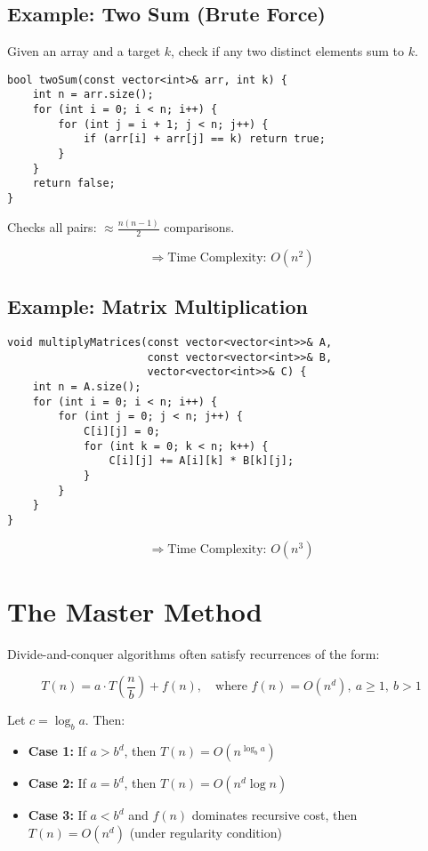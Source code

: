 \documentclass{article}
\begin{document}
\subsection*{Example: Two Sum (Brute Force)}

Given an array and a target $k$, check if any two distinct elements sum to $k$.

\begin{lstlisting}[style=cppstyle]
bool twoSum(const vector<int>& arr, int k) {
    int n = arr.size();
    for (int i = 0; i < n; i++) {
        for (int j = i + 1; j < n; j++) {
            if (arr[i] + arr[j] == k) return true;
        }
    }
    return false;
}
\end{lstlisting}

Checks all pairs: $\approx \frac{n(n-1)}{2}$ comparisons.

\[
\Rightarrow \text{Time Complexity: } O(n^2)
\]

\subsection{Example: Matrix Multiplication}
\begin{lstlisting}[style=cppstyle]
void multiplyMatrices(const vector<vector<int>>& A,
                      const vector<vector<int>>& B,
                      vector<vector<int>>& C) {
    int n = A.size();
    for (int i = 0; i < n; i++) {
        for (int j = 0; j < n; j++) {
            C[i][j] = 0;
            for (int k = 0; k < n; k++) {
                C[i][j] += A[i][k] * B[k][j];
            }
        }
    }
}
\end{lstlisting}

\[
\Rightarrow \text{Time Complexity: } O(n^3)
\]

\section{The Master Method}

Divide-and-conquer algorithms often satisfy recurrences of the form:

\[
T(n) = a \cdot T\left(\frac{n}{b}\right) + f(n), \quad \text{where } f(n) = O(n^d),\ a \ge 1,\ b > 1
\]

Let $c = \log_b a$. Then:

\begin{itemize}
    \item \textbf{Case 1:} If $a > b^d$, then $T(n) = O(n^{\log_b a})$
    \item \textbf{Case 2:} If $a = b^d$, then $T(n) = O(n^d \log n)$
    \item \textbf{Case 3:} If $a < b^d$ and $f(n)$ dominates recursive cost, then $T(n) = O(n^d)$ (under regularity condition)
\end{itemize}
\end{document}
